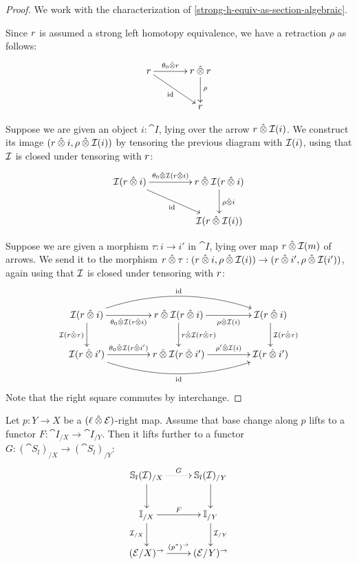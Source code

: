 \documentclass[reqno,10pt,a4paper,oneside]{amsart}
\begin{document}
\begin{proof}
We work with the characterization of \cref{strong-h-equiv-as-section-algebraic}.

Since $\intervalr$ is assumed a strong left homotopy equivalence, we have a retraction $\rho$ as follows:
\[
\xymatrix@C+1em{
  \intervalr
  \ar[r]^-{\thetal \hatotimes \intervalr}
  \ar[dr]_{\id}
&
  \intervalr \hatotimes \intervalr \ar[d]^{\rho}
\\&
  \intervalr
}
\]

Suppose we are given an object $i : \cat{I}$, lying over the arrow $\intervalr \hatotimes \cal{I}(i)$.
We construct its image $(\intervalr \hatotimes i, \rho \hatotimes \cal{I}(i))$ by tensoring the previous diagram with $\cal{I}(i)$, using that $\cal{I}$ is closed under tensoring with $\intervalr$:
\[
\xymatrix@C+2em{
  \cal{I}(\intervalr \hatotimes i)
  \ar[r]^-{\thetal \hatotimes \cal{I}(\intervalr \hatotimes i)}
  \ar[dr]_{\id}
&
  \intervalr \hatotimes \cal{I}(\intervalr \hatotimes i \ar[d]^{\rho \hatotimes i})
\\&
  \cal{I}(\intervalr \hatotimes \cal{I}(i))
}
\]

Suppose we are given a morphism $\tau : i \to i'$ in $\cat{I}$, lying over map $\intervalr \hatotimes \cal{I}(m)$ of arrows.
We send it to the morphism $\intervalr \hatotimes \tau : (\intervalr \hatotimes i, \rho \hatotimes \cal{I}(i)) \to (\intervalr \hatotimes i', \rho \hatotimes \cal{I}(i'))$, again using that $\cal{I}$ is closed under tensoring with $\intervalr$: 
\[
\xymatrix@C+2em{
  \cal{I}(\intervalr \hatotimes i)
  \ar[r]_-{\thetal \hatotimes \cal{I}(\intervalr \hatotimes i)}
  \ar[d]_{\cal{I}(\intervalr \hatotimes \tau)}
  \ar@/^2em/[rr]^{\id}
&
  \intervalr \hatotimes \cal{I}(\intervalr \hatotimes i)
  \ar[r]_-{\rho \hatotimes \cal{I}(i)}
  \ar[d]^{\intervalr \hatotimes \cal{I}(\intervalr \hatotimes \tau)}
&
  \cal{I}(\intervalr \hatotimes i)
  \ar[d]^{\cal{I}(\intervalr \hatotimes \tau)}
\\
  \cal{I}(\intervalr \hatotimes i')
  \ar[r]^-{\thetal \hatotimes \cal{I}(\intervalr \hatotimes i')}
  \ar@/_2em/[rr]_{\id}
&
  \intervalr \hatotimes \cal{I}(\intervalr \hatotimes i')
  \ar[r]^-{\rho' \hatotimes \cal{I}(i)}
&
  \cal{I}(\intervalr \hatotimes i')
}
\]
Note that the right square commutes by interchange.
\end{proof}

\begin{lemma}
\label{strong-h-equiv-base-change-along-fibration}
Let $p : Y \to X$ be a $(\intervall \hatotimes \calE)$-right map.
Assume that base change along $p$ lifts to a functor $F : \cat{I}_{/X} \to \cat{I}_{/Y}$.
Then it lifts further to a functor $G : (\cat{S}_l)_{/X} \to (\cat{S}_l)_{/Y}$:
\[
\xymatrix{
  \cat{S}_l(\cal{I})_{/X}
  \ar@{.>}[r]^{G}
  \ar[d]
&
  \cat{S}_l(\cal{I})_{/Y}
  \ar[d]
\\
  \cat{I}_{/X}
  \ar[r]^{F}
  \ar[d]_{\cal{I}_{/X}}
&
  \cat{I}_{/Y}
  \ar[d]^{\cal{I}_{/Y}}
\\
  (\catE / X)^{\to}
  \ar[r]^{(p^*)^{\to}}
&
  (\catE / Y)^{\to}
}
\]
\end{lemma}
\end{document}
